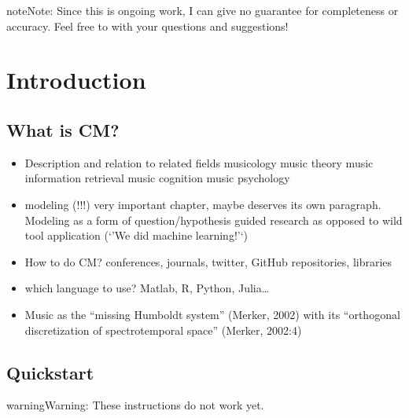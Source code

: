 \documentclass[letterpaper,10pt,english]{sphinxmanual}
\begin{document}
\begin{sphinxadmonition}{note}{Note:}
Since this is ongoing work, I can give no guarantee for completeness or accuracy.
Feel free to  with your questions and suggestions!
\end{sphinxadmonition}


\chapter{Introduction}
\label{\detokenize{0_intro:introduction}}\label{\detokenize{0_intro::doc}}

\section{What is CM?}
\label{\detokenize{0_intro:what-is-cm}}\begin{itemize}
\item {} 
Description and relation to related fields
\textendash{} musicology
\textendash{} music theory
\textendash{} music information retrieval
\textendash{} music cognition
\textendash{} music psychology

\item {} 
modeling (!!!) very important chapter, maybe deserves its own paragraph. Modeling as a form of question/hypothesis guided research as opposed to wild tool application (‘’We did machine learning!’‘)

\item {} 
How to do CM? conferences, journals, twitter, GitHub repositories, libraries

\item {} 
which language to use? Matlab, R, Python, Julia…

\item {} 
Music as the “missing Humboldt system” (Merker, 2002) with its “orthogonal discretization of spectro\sphinxhyphen{}temporal space” (Merker, 2002:4)

\end{itemize}


\section{Quickstart}
\label{\detokenize{0_intro:quickstart}}
\begin{sphinxadmonition}{warning}{Warning:}
These instructions do not work yet.
\end{sphinxadmonition}
\end{document}
